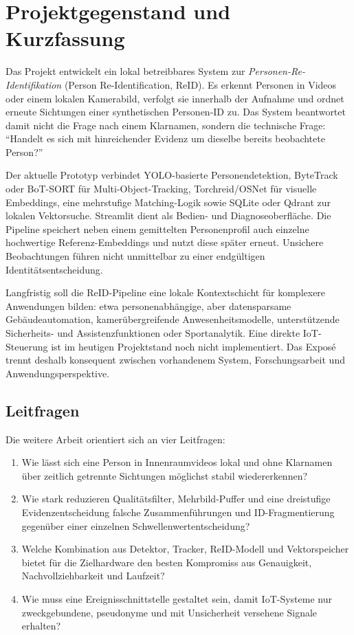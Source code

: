 \section{Projektgegenstand und Kurzfassung}

Das Projekt entwickelt ein lokal betreibbares System zur
\emph{Personen-Re-Identifikation} (Person Re-Identification, ReID). Es erkennt
Personen in Videos oder einem lokalen Kamerabild, verfolgt sie innerhalb der
Aufnahme und ordnet erneute Sichtungen einer synthetischen Personen-ID zu. Das
System beantwortet damit nicht die Frage nach einem Klarnamen, sondern die
technische Frage: \enquote{Handelt es sich mit hinreichender Evidenz um dieselbe
bereits beobachtete Person?}

Der aktuelle Prototyp verbindet YOLO-basierte Personendetektion, ByteTrack oder
BoT-SORT für Multi-Object-Tracking, Torchreid/OSNet für visuelle Embeddings,
eine mehrstufige Matching-Logik sowie SQLite oder Qdrant zur lokalen
Vektorsuche. Streamlit dient als Bedien- und Diagnoseoberfläche. Die Pipeline
speichert neben einem gemittelten Personenprofil auch einzelne hochwertige
Referenz-Embeddings und nutzt diese später erneut. Unsichere Beobachtungen
führen nicht unmittelbar zu einer endgültigen Identitätsentscheidung.

Langfristig soll die ReID-Pipeline eine lokale Kontextschicht für komplexere
Anwendungen bilden: etwa personenabhängige, aber datensparsame
Gebäudeautomation, kamerübergreifende Anwesenheitsmodelle, unterstützende
Sicherheits- und Assistenzfunktionen oder Sportanalytik. Eine direkte
IoT-Steuerung ist im heutigen Projektstand noch nicht implementiert. Das Exposé
trennt deshalb konsequent zwischen vorhandenem System, Forschungsarbeit und
Anwendungsperspektive.

\subsection{Leitfragen}

Die weitere Arbeit orientiert sich an vier Leitfragen:

\begin{enumerate}[label=\textbf{F\arabic*:},leftmargin=18mm]
  \item Wie lässt sich eine Person in Innenraumvideos lokal und ohne Klarnamen
    über zeitlich getrennte Sichtungen möglichst stabil wiedererkennen?
  \item Wie stark reduzieren Qualitätsfilter, Mehrbild-Puffer und eine
    dreistufige Evidenzentscheidung falsche Zusammenführungen und
    ID-Fragmentierung gegenüber einer einzelnen Schwellenwertentscheidung?
  \item Welche Kombination aus Detektor, Tracker, ReID-Modell und Vektorspeicher
    bietet für die Zielhardware den besten Kompromiss aus Genauigkeit,
    Nachvollziehbarkeit und Laufzeit?
  \item Wie muss eine Ereignisschnittstelle gestaltet sein, damit IoT-Systeme
    nur zweckgebundene, pseudonyme und mit Unsicherheit versehene Signale
    erhalten?
\end{enumerate}


